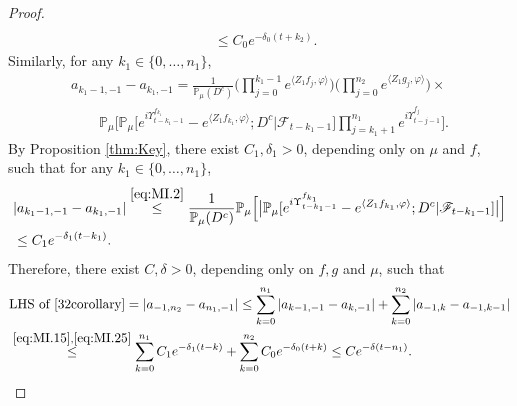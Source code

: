 \documentclass[12pt,a4paper]{amsart}
\theoremstyle{plain}
\theoremstyle{definition}
\numberwithin{equation}{section}
\begin{document}
\begin{proof}
\begin{align}
    \\&\label{eq:MI.15} \leq C_0 e^{-\delta_0 (t+k_2)}.
\end{align}
	Similarly, for any $k_1 \in \{0, \dots , n_1\}$,
\begin{equation}
\label{eq:MI.2}
\begin{multlined}
	a_{k_1-1,-1} - a_{k_1,-1}
	=  \frac{1}{\mathbb P_\mu(D^c)} \Big(\prod_{j=0}^{k_1-1}e^{\langle Z_1 f_j, \varphi\rangle}\Big) \Big(\prod_{j=0}^{n_2} e^{ \langle Z_1g_j,\varphi \rangle} \Big) \times {}
	\\ \qquad \mathbb{P}_{\mu}\Big[ \mathbb P_\mu\big[e^{i\Upsilon_{t-k_1-1}^{f_{k_1}}} -e^{\langle Z_1 f_{k_1}, \varphi\rangle}  ; D^c \big| \mathscr F_{t-k_1 - 1}\big] \prod_{j=k_1+1}^{n_1} e^{i\Upsilon_{t-j-1}^{f_j}} \Big] .
\end{multlined}
\end{equation}
	By Proposition \ref{thm:Key}, there exist $C_1,\delta_1 >0$, depending only on $\mu$ and $f$, such that for any $k_1 \in \{0,\dots,n_1\}$,
\begin{align}
    &| a_{k_1-1,-1} - a_{k_1,-1}|
    \overset{\eqref{eq:MI.2}}\leq \frac{1}{\mathbb{P}_{\mu}(D^c)}\mathbb{P}_{\mu}\Big[\big|\mathbb P_\mu[e^{i\Upsilon^{f_{k_1}}_{t-k_1-1}}-e^{\langle Z_1f_{k_1}, \varphi\rangle}; D^c|\mathscr F_{t-k_1-1}]\big|\Big]
    \\&\label{eq:MI.25} \leq C_1 e^{-\delta_1 (t-k_1)}.
\end{align}
	Therefore, there exist $C,\delta >0$, depending only on $f,g$ and $\mu$, such that
\begin{align}
    &\text{LHS of \eqref{32corollary}}
    = \left|a_{-1,n_2}-a_{n_1,-1}\right|
    \leq \sum_{k=0}^{n_1}\left|a_{k-1,-1}-a_{k,-1}\right|+\sum_{k=0}^{n_2}\left|a_{-1,k}-a_{-1,k-1}\right|
    \\& \overset{\eqref{eq:MI.15},\eqref{eq:MI.25}}\leq \sum_{k=0}^{n_1} C_1 e^{-\delta_1 (t-k)}+\sum_{k=0}^{n_2} C_0 e^{-\delta_0 (t+k)}
  	\leq C e^{- \delta (t-n_1)}.
    \qedhere
\end{align}
\end{proof}
\end{document}
